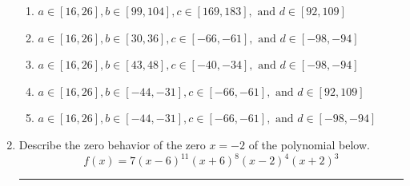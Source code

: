 \documentclass[14pt]{extbook}
\newcommand{\litem}[1]{\item#1\hspace*{-1cm}\rule{\textwidth}{0.4pt}}
\begin{document}
\begin{enumerate}
{\begin{enumerate}[label=\Alph*.]
\item \( a \in [16, 26], b \in [99, 104], c \in [169, 183], \text{ and } d \in [92, 109] \)
\item \( a \in [16, 26], b \in [30, 36], c \in [-66, -61], \text{ and } d \in [-98, -94] \)
\item \( a \in [16, 26], b \in [43, 48], c \in [-40, -34], \text{ and } d \in [-98, -94] \)
\item \( a \in [16, 26], b \in [-44, -31], c \in [-66, -61], \text{ and } d \in [92, 109] \)
\item \( a \in [16, 26], b \in [-44, -31], c \in [-66, -61], \text{ and } d \in [-98, -94] \)

\end{enumerate} }
\litem{
Describe the zero behavior of the zero $x = -2$ of the polynomial below.\[ f(x) = 7(x - 6)^{11}(x + 6)^{8}(x - 2)^{4}(x + 2)^{3} \]\begin{enumerate}[label=\Alph*.]

\end{enumerate}}
\end{enumerate}
\end{document}
